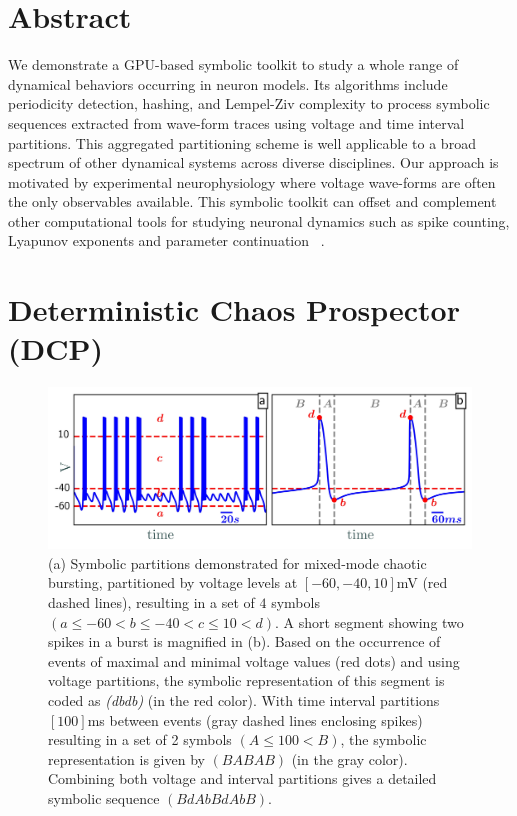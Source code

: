 \documentclass{ws-book9x6}
\begin{document}
\section{Abstract}
We demonstrate a GPU-based symbolic toolkit to study a whole range of dynamical behaviors occurring in neuron models. Its algorithms include periodicity detection, hashing, and Lempel-Ziv complexity to process symbolic sequences extracted from wave-form traces using voltage and time interval partitions. This aggregated partitioning scheme is well applicable to a broad spectrum of other dynamical systems across diverse disciplines. Our approach is motivated by experimental neurophysiology where voltage wave-forms are often the only observables available. This symbolic toolkit can offset and complement other computational tools for studying neuronal dynamics such as spike counting, Lyapunov exponents and parameter continuation ~\cite{barrio2014, ju2018, shilnikov2012}.


\section{Deterministic Chaos Prospector (DCP)}

\begin{figure}[ht!]
\hspace{-12pt}
\includegraphics[width=1.03\textwidth]{DCPImages/Image0}
\caption{(a) Symbolic partitions demonstrated for mixed-mode chaotic bursting, partitioned by voltage levels at  $[-60, -40, 10]$mV (red dashed lines), resulting in a set of $4$ symbols $(a \leq -60 < b \leq -40 < c \leq 10 < d)$. A short segment showing two spikes in a burst is magnified in (b). Based on the occurrence of events of maximal and minimal voltage values (red dots) and using voltage partitions, the symbolic representation of this segment is coded as {\it (dbdb)} (in the red color). With time interval partitions $[100]$ms between events (gray dashed lines enclosing spikes) resulting in a set of 2 symbols $(A \leq 100 < B)$, the symbolic representation is given by $(BABAB)$ (in the gray color).  Combining both voltage and interval partitions gives a detailed symbolic sequence $(BdAbBdAbB)$.}\label{fig:plantTrajectory}
\end{figure}
\end{document}
